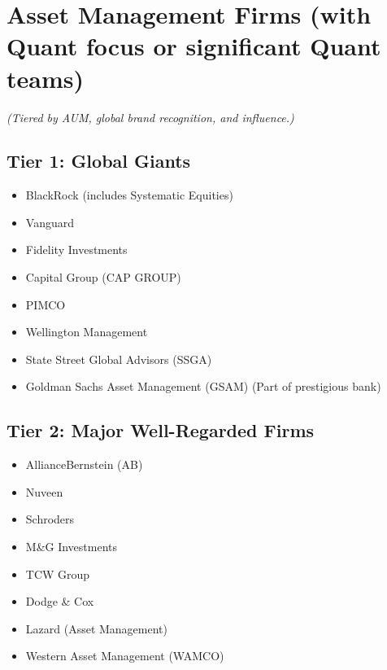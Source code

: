 \documentclass[11pt,a4paper]{article}
\begin{document}
\section*{Asset Management Firms (with Quant focus or significant Quant teams)}
\begin{center}
\footnotesize
\textit{(Tiered by AUM, global brand recognition, and influence.)}
\end{center}

\subsection*{Tier 1: Global Giants}
\begin{multicols}{3}
\begin{itemize}[label=\textbullet, leftmargin=*, itemsep=1pt, parsep=0pt]
    \item BlackRock (includes Systematic Equities)
    \item Vanguard
    \item Fidelity Investments
    \item Capital Group (CAP GROUP)
    \item PIMCO
    \item Wellington Management
    \item State Street Global Advisors (SSGA)
    \item Goldman Sachs Asset Management (GSAM) (Part of prestigious bank)
\end{itemize}
\end{multicols}

\subsection*{Tier 2: Major Well-Regarded Firms}
\begin{multicols}{3}
\begin{itemize}[label=\textbullet, leftmargin=*, itemsep=1pt, parsep=0pt]
    \item AllianceBernstein (AB)
    \item Nuveen
    \item Schroders
    \item M\&G Investments
    \item TCW Group
    \item Dodge \& Cox
    \item Lazard (Asset Management)
    \item Western Asset Management (WAMCO)
\end{itemize}
\end{multicols}
\end{document}
